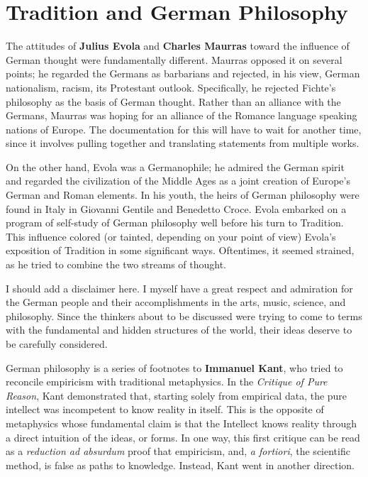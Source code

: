 \section{Tradition and German Philosophy}

The attitudes of \textbf{Julius Evola} and \textbf{Charles Maurras} toward the influence of German thought were
fundamentally different. Maurras opposed it on several points; he regarded the Germans as barbarians and rejected, in
his view, German nationalism, racism, its Protestant outlook. Specifically, he rejected Fichte's philosophy
as the basis of German thought. Rather than an alliance with the Germans, Maurras was hoping for an alliance of the
Romance language speaking nations of Europe. The documentation for this will have to wait for another time, since it
involves pulling together and translating statements from multiple works.

On the other hand, Evola was a Germanophile; he admired the German spirit and regarded the civilization of the Middle
Ages as a joint creation of Europe's German and Roman elements. In his youth, the heirs of German
philosophy were found in Italy in Giovanni Gentile and Benedetto Croce. Evola embarked on a program of self-study of
German philosophy well before his turn to Tradition. This influence colored (or tainted, depending on your point of
view) Evola's exposition of Tradition in some significant ways. Oftentimes, it seemed strained, as he tried
to combine the two streams of thought.

I should add a disclaimer here. I myself have a great respect and admiration for the German people and their
accomplishments in the arts, music, science, and philosophy. Since the thinkers about to be discussed were trying to
come to terms with the fundamental and hidden structures of the world, their ideas deserve to be carefully considered.

German philosophy is a series of footnotes to \textbf{Immanuel Kant}, who tried to reconcile empiricism with traditional
metaphysics. In the \textit{Critique of Pure Reason}, Kant demonstrated that, starting solely from empirical data, the pure
intellect was incompetent to know reality in itself. This is the opposite of metaphysics whose fundamental claim is
that the Intellect knows reality through a direct intuition of the ideas, or forms. In one way, this first critique can
be read as a \emph{reduction ad absurdum} proof that empiricism, and, \emph{a fortiori}, the scientific method, is
false as paths to knowledge. Instead, Kant went in another direction.

